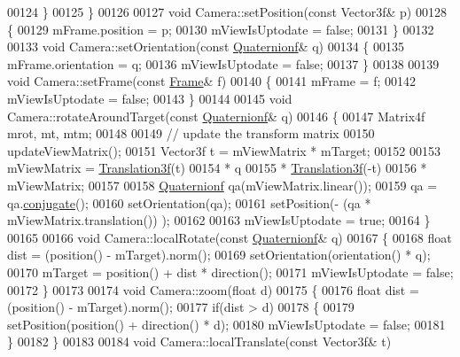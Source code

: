 \begin{DoxyCode}
00124     \}
00125 \}
00126 
00127 \textcolor{keywordtype}{void} Camera::setPosition(\textcolor{keyword}{const} Vector3f& p)
00128 \{
00129     mFrame.position = p;
00130     mViewIsUptodate = \textcolor{keyword}{false};
00131 \}
00132 
00133 \textcolor{keywordtype}{void} Camera::setOrientation(\textcolor{keyword}{const} \hyperlink{group___geometry___module_class_eigen_1_1_quaternion}{Quaternionf}& q)
00134 \{
00135     mFrame.orientation = q;
00136     mViewIsUptodate = \textcolor{keyword}{false};
00137 \}
00138 
00139 \textcolor{keywordtype}{void} Camera::setFrame(\textcolor{keyword}{const} \hyperlink{class_frame}{Frame}& f)
00140 \{
00141   mFrame = f;
00142   mViewIsUptodate = \textcolor{keyword}{false};
00143 \}
00144 
00145 \textcolor{keywordtype}{void} Camera::rotateAroundTarget(\textcolor{keyword}{const} \hyperlink{group___geometry___module_class_eigen_1_1_quaternion}{Quaternionf}& q)
00146 \{
00147     Matrix4f mrot, mt, mtm;
00148     
00149     \textcolor{comment}{// update the transform matrix}
00150     updateViewMatrix();
00151     Vector3f t = mViewMatrix * mTarget;
00152 
00153     mViewMatrix = \hyperlink{group___geometry___module_class_eigen_1_1_translation}{Translation3f}(t)
00154                 * q
00155                 * \hyperlink{group___geometry___module_class_eigen_1_1_translation}{Translation3f}(-t)
00156                 * mViewMatrix;
00157     
00158     \hyperlink{group___geometry___module_class_eigen_1_1_quaternion}{Quaternionf} qa(mViewMatrix.linear());
00159     qa = qa.\hyperlink{group___geometry___module_aa82dabadce488031c298a5a0a92cda14}{conjugate}();
00160     setOrientation(qa);
00161     setPosition(- (qa * mViewMatrix.translation()) );
00162 
00163     mViewIsUptodate = \textcolor{keyword}{true};
00164 \}
00165 
00166 \textcolor{keywordtype}{void} Camera::localRotate(\textcolor{keyword}{const} \hyperlink{group___geometry___module_class_eigen_1_1_quaternion}{Quaternionf}& q)
00167 \{
00168     \textcolor{keywordtype}{float} dist = (position() - mTarget).norm();
00169     setOrientation(orientation() * q);
00170     mTarget = position() + dist * direction();
00171     mViewIsUptodate = \textcolor{keyword}{false};
00172 \}
00173 
00174 \textcolor{keywordtype}{void} Camera::zoom(\textcolor{keywordtype}{float} d)
00175 \{
00176     \textcolor{keywordtype}{float} dist = (position() - mTarget).norm();
00177     \textcolor{keywordflow}{if}(dist > d)
00178     \{
00179         setPosition(position() + direction() * d);
00180         mViewIsUptodate = \textcolor{keyword}{false};
00181     \}
00182 \}
00183 
00184 \textcolor{keywordtype}{void} Camera::localTranslate(\textcolor{keyword}{const} Vector3f& t)

\end{DoxyCode}
